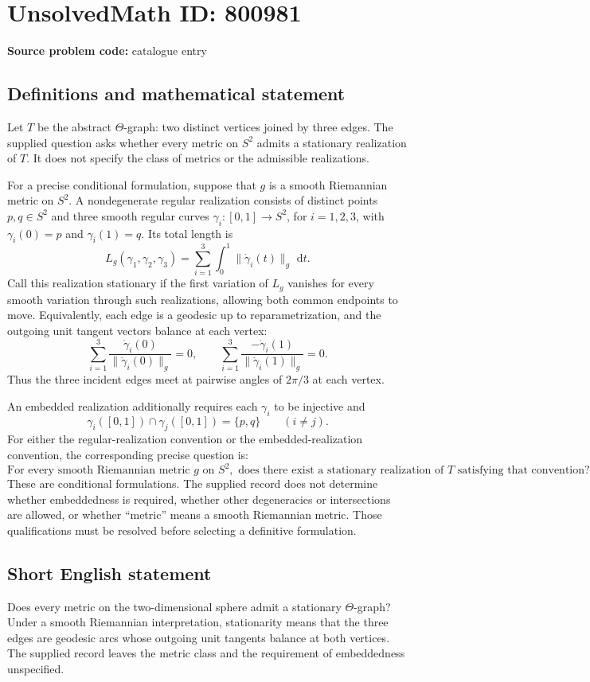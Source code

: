 \documentclass[11pt]{article}
\newcommand{\dd}{\,\mathrm{d}}
\begin{document}
\section*{UnsolvedMath ID: 800981}
\textbf{Source problem code:} catalogue entry
\subsection{Definitions and mathematical statement}
Let \(T\) be the abstract \(\Theta\)-graph: two distinct vertices joined by three edges. The supplied question asks whether every metric on \(S^2\) admits a stationary realization of \(T\). It does not specify the class of metrics or the admissible realizations.

For a precise conditional formulation, suppose that \(g\) is a smooth Riemannian metric on \(S^2\). A nondegenerate regular realization consists of distinct points \(p,q\in S^2\) and three smooth regular curves \(\gamma_i:[0,1]\to S^2\), for \(i=1,2,3\), with \(\gamma_i(0)=p\) and \(\gamma_i(1)=q\). Its total length is
\[
L_g(\gamma_1,\gamma_2,\gamma_3)=\sum_{i=1}^{3}\int_0^1\lVert\dot\gamma_i(t)\rVert_g\,\dd t.
\]
Call this realization stationary if the first variation of \(L_g\) vanishes for every smooth variation through such realizations, allowing both common endpoints to move. Equivalently, each edge is a geodesic up to reparametrization, and the outgoing unit tangent vectors balance at each vertex:
\[
\sum_{i=1}^{3}\frac{\dot\gamma_i(0)}{\lVert\dot\gamma_i(0)\rVert_g}=0,
\qquad
\sum_{i=1}^{3}\frac{-\dot\gamma_i(1)}{\lVert\dot\gamma_i(1)\rVert_g}=0.
\]
Thus the three incident edges meet at pairwise angles of \(2\pi/3\) at each vertex.

An embedded realization additionally requires each \(\gamma_i\) to be injective and
\[
\gamma_i([0,1])\cap\gamma_j([0,1])=\{p,q\}\qquad(i\ne j).
\]
For either the regular-realization convention or the embedded-realization convention, the corresponding precise question is:
\[
\text{For every smooth Riemannian metric }g\text{ on }S^2,
\text{ does there exist a stationary realization of }T
\text{ satisfying that convention?}
\]
These are conditional formulations. The supplied record does not determine whether embeddedness is required, whether other degeneracies or intersections are allowed, or whether ``metric'' means a smooth Riemannian metric. Those qualifications must be resolved before selecting a definitive formulation.
\subsection{Short English statement}
Does every metric on the two-dimensional sphere admit a stationary \(\Theta\)-graph? Under a smooth Riemannian interpretation, stationarity means that the three edges are geodesic arcs whose outgoing unit tangents balance at both vertices. The supplied record leaves the metric class and the requirement of embeddedness unspecified.
\end{document}
